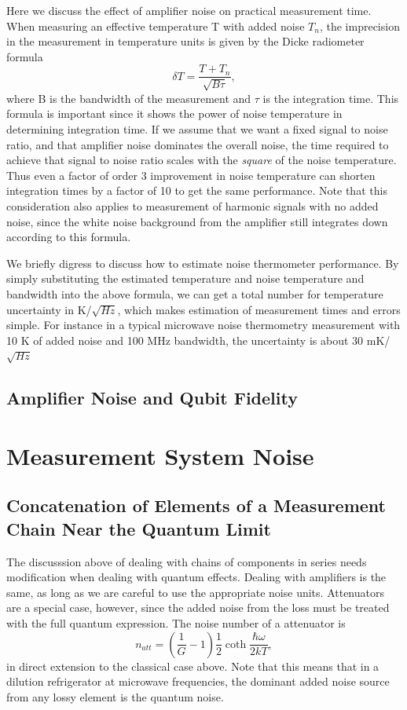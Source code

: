 \documentclass{report}
\begin{document}
	Here we discuss the effect of amplifier noise on practical measurement time.  When measuring an effective temperature T with added noise $T_n$, the imprecision in the measurement in temperature units is given by the Dicke radiometer formula
\begin{equation}
\delta T = \frac{T + T_n}{\sqrt{B\tau}},
\end{equation}
where B is the bandwidth of the measurement and $\tau$ is the integration time.  This formula is important since it shows the power of noise temperature in determining integration time.  If we assume that we want a fixed signal to noise ratio, and that amplifier noise dominates the overall noise, the time required to achieve that signal to noise ratio scales with the \textit{square} of the noise temperature.  Thus even a factor of order 3 improvement in noise temperature can shorten integration times by a factor of 10 to get the same performance.  Note that this consideration also applies to measurement of harmonic signals with no added noise, since the white noise background from the amplifier still integrates down according to this formula.  

We briefly digress to discuss how to estimate noise thermometer performance.  By simply substituting the estimated temperature and noise temperature and bandwidth into the above formula, we can get a total number for temperature uncertainty in K/$\sqrt{Hz}$, which makes estimation of measurement times and errors simple.  For instance in a typical microwave noise thermometry measurement with 10 K of added noise and 100 MHz bandwidth, the uncertainty is about 30 mK/$\sqrt{Hz}$

	\subsection{Amplifier Noise and Qubit Fidelity}

\section{Measurement System Noise}
	\subsection{Concatenation of Elements of a Measurement Chain Near the Quantum Limit}
		
	The discusssion above of dealing with chains of components in series needs modification when dealing with quantum effects.  Dealing with amplifiers is the same, as long as we are careful to use the appropriate noise units.  Attenuators are a special case, however, since the added noise from the loss must be treated with the full quantum expression.  The noise number of a attenuator is
\begin{equation}
n_{att} = \left(\frac{1}{G} - 1\right)\frac{1}{2}\coth{\frac{\hbar\omega}{2kT}}, 
\end{equation}
in direct extension to the classical case above.  Note that this means that in a dilution refrigerator at microwave frequencies, the dominant added noise source from any lossy element is the quantum noise.  
\end{document}

